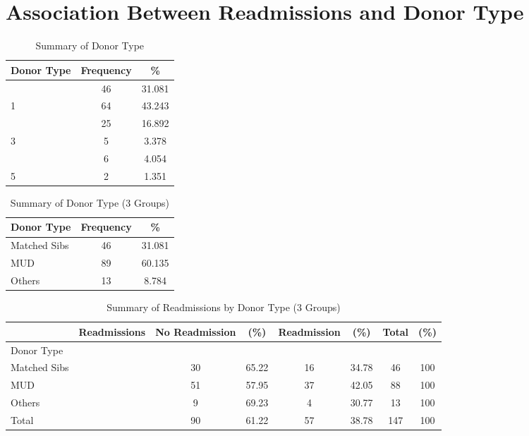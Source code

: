 \documentclass[12pt,]{article}
\begin{document}
\pagebreak

\section{Association Between Readmissions and Donor
Type}\label{association-between-readmissions-and-donor-type}

\begin{table}[!h]

\caption{\label{tab:unnamed-chunk-2}Summary of Donor Type}
\centering
\begin{tabular}{>{\centering\arraybackslash}p{5cm}cc}
\toprule
Donor Type & Frequency & \%\\
\midrule
0 & 46 & 31.081\\
\rowcolor[HTML]{E3E5E7}  1 & 64 & 43.243\\
2 & 25 & 16.892\\
\rowcolor[HTML]{E3E5E7}  3 & 5 & 3.378\\
4 & 6 & 4.054\\
\addlinespace
\rowcolor[HTML]{E3E5E7}  5 & 2 & 1.351\\
\bottomrule
\end{tabular}
\end{table}

\begin{table}[!h]

\caption{\label{tab:unnamed-chunk-2}Summary of Donor Type (3 Groups)}
\centering
\begin{tabular}{>{\centering\arraybackslash}p{5cm}cc}
\toprule
Donor Type & Frequency & \%\\
\midrule
Matched Sibs & 46 & 31.081\\
\rowcolor[HTML]{E3E5E7}  MUD & 89 & 60.135\\
Others & 13 & 8.784\\
\bottomrule
\end{tabular}
\end{table}

\begin{table}[!h]

\caption{\label{tab:unnamed-chunk-2}Summary of Readmissions by Donor Type (3 Groups)}
\centering
\begin{tabular}{>{\centering\arraybackslash}p{5cm}ccccccc}
\toprule
  & Readmissions & No Readmission & (\%) & Readmission & (\%) & Total & (\%)\\
\midrule
Donor Type &  &  &  &  &  &  & \\
\rowcolor[HTML]{E3E5E7}  Matched Sibs &  & 30 & 65.22 & 16 & 34.78 & 46 & 100\\
MUD &  & 51 & 57.95 & 37 & 42.05 & 88 & 100\\
\rowcolor[HTML]{E3E5E7}  Others &  & 9 & 69.23 & 4 & 30.77 & 13 & 100\\
Total &  & 90 & 61.22 & 57 & 38.78 & 147 & 100\\
\bottomrule
\end{tabular}
\end{table}
\end{document}
